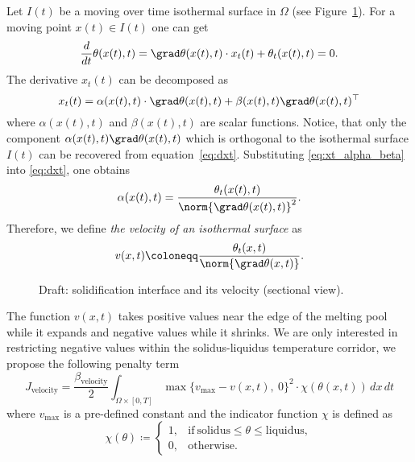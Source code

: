 Let $I(t)$ be a moving over time isothermal surface in $\Omega$ (see Figure~\ref{fig:velocity}). For a moving point $x(t) \in I(t)$ one can get
\begin{equation} \label{eq:dxt}
	\frac{d}{dt} \theta(x(t),t) = \grad \theta(x(t),t) \cdot x_t(t) + \theta_t(x(t),t) = 0.
\end{equation}
The derivative $x_t(t)$ can be decomposed as
\begin{equation} \label{eq:xt_alpha_beta}
	x_t(t) = \alpha(x(t),t) \cdot \grad \theta(x(t),t) + \beta(x(t),t) \grad \theta(x(t),t)^{\top}
\end{equation}
where $\alpha(x(t),t)$ and $\beta(x(t),t)$ are scalar functions. Notice, that only the component $\alpha(x(t),t) \grad \theta(x(t),t)$ which is orthogonal to the isothermal surface $I(t)$ can be recovered from equation~\eqref{eq:dxt}. Substituting \eqref{eq:xt_alpha_beta} into \eqref{eq:dxt}, one obtains
\begin{equation}
	\alpha(x(t),t) = \frac{\theta_t(x(t),t)}{\norm{\grad \theta(x(t),t)}^2}.
\end{equation}
Therefore, we define \emph{the velocity of an isothermal surface} as
\begin{equation}
	v(x,t) \coloneqq \frac{\theta_t(x,t)}{\norm{\grad \theta(x,t)}}.
\end{equation}


\begin{figure}
	\centering
	
	\caption{Draft: solidification interface and its velocity (sectional view).}
	\label{fig:velocity}
\end{figure}

The function $v(x,t)$ takes positive values near the edge of the melting pool while it expands and negative values while it shrinks. We are only interested in restricting negative values within the solidus-liquidus temperature corridor, we propose the following penalty term
\begin{equation}
	J_{\text{velocity}} = \frac{\beta_\text{velocity}}{2}
	\int_{\Omega \times [0,T]} \max \{ v_{\max} - v(x,t),\ 0 \}^2 \cdot \chi(\theta(x,t))\, dx\,dt
\end{equation}where $v_{\max}$ is a pre-defined constant and the indicator function $\chi$ is defined as
\begin{equation}
	\chi(\theta) \coloneqq \left\{
		\begin{array}{ll}
			1, & \text{if}\ \text{solidus} \le \theta \le \text{liquidus}, \\
			0, & \text{otherwise}.
		\end{array} \right.
\end{equation}


